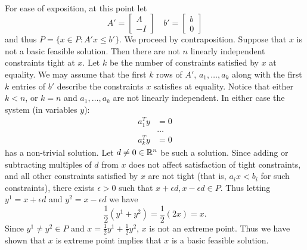 \paragraph{}
For ease of exposition, at this point let $$A' = \begin{bmatrix} A \\ -I \end{bmatrix} \quad b' = \begin{bmatrix} b \\ 0 \end{bmatrix}$$ and thus $P = \{x\in P : A'x \leq b'\}$. We proceed by contraposition. Suppose that $x$ is not a basic feasible solution. Then there are not $n$ linearly independent constraints tight at $x$. Let $k$ be the number of constraints satisfied by $x$ at equality. We may assume that the first $k$ rows of $A'$, $a_1, \dots, a_k$ along with the first $k$ entries of $b'$ describe the constraints $x$ satisfies at equality. Notice that either $k<n$, or $k=n$ and $a_1, \dots, a_k$ are not linearly independent. In either case the system (in variables $y$):
\begin{align*}
a_1^T y &= 0 \\
&\dots \\
a_k^T y &= 0
\end{align*}
has a non-trivial solution. Let $d \neq 0 \in \mathbb{R}^n$ be such a solution. Since adding or subtracting multiples of $d$ from $x$ does not affect satisfaction of tight constraints, and all other constraints satisfied by $x$ are not tight (that is, $a_i x < b_i$ for such constraints), there exists $\epsilon > 0$ such that $x+ \epsilon d, x-\epsilon d \in P$. Thus letting $y^1 = x+ \epsilon d$ and $y^2 = x-\epsilon d$ we have
$$\frac{1}{2}(y^1 + y^2) = \frac{1}{2}(2x) = x.$$
Since $y^1 \neq y^2 \in P$ and $x = \frac{1}{2}y^1 + \frac{1}{2}y^2$, $x$ is not an extreme point. Thus we have shown that $x$ is extreme point implies that $x$ is a basic feasible solution.
